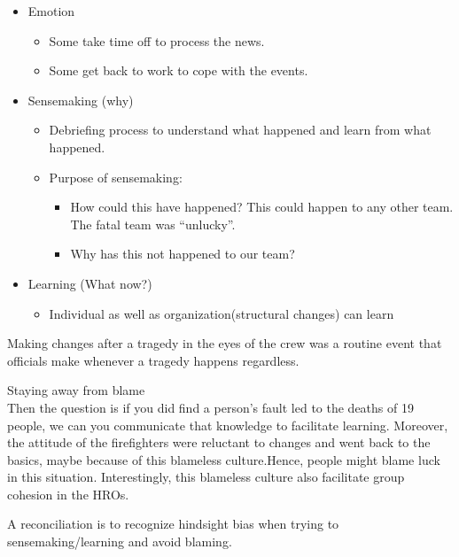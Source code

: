 \documentclass[
]{book}
\providecommand{\tightlist}{%
  \setlength{\itemsep}{0pt}\setlength{\parskip}{0pt}}
\begin{document}
\begin{itemize}
\item
  Emotion

  \begin{itemize}
  \tightlist
  \item
    Some take time off to process the news.
  \item
    Some get back to work to cope with the events.
  \end{itemize}
\item
  Sensemaking (why)

  \begin{itemize}
  \item
    Debriefing process to understand what happened and learn from what happened.
  \item
    Purpose of sensemaking:

    \begin{itemize}
    \tightlist
    \item
      How could this have happened? This could happen to any other team. The fatal team was ``unlucky''.
    \item
      Why has this not happened to our team?
    \end{itemize}
  \end{itemize}
\item
  Learning (What now?)

  \begin{itemize}
  \tightlist
  \item
    Individual as well as organization(structural changes) can learn
  \end{itemize}
\end{itemize}

Making changes after a tragedy in the eyes of the crew was a routine event that officials make whenever a tragedy
happens regardless.

Staying away from blame\\
Then the question is if you did find a person's fault led to the deaths of 19 people, we can you communicate that
knowledge to facilitate learning. Moreover, the attitude of the firefighters were reluctant to changes and went back to
the basics, maybe because of this blameless culture.Hence, people might blame luck in this situation. Interestingly,
this blameless culture also facilitate group cohesion in the HROs.

A reconciliation is to recognize hindsight bias when trying to sensemaking/learning and avoid blaming.
\end{document}
